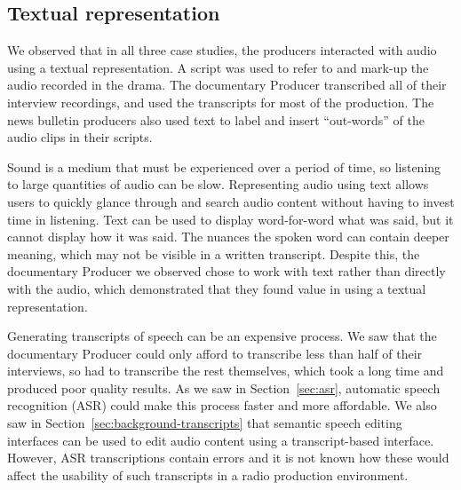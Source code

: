 
\subsection{Textual representation}
We observed that in all three case studies, the producers interacted with audio using a textual representation. A
script was used to refer to and mark-up the audio recorded in the drama. The documentary Producer transcribed all of
their interview recordings, and used the transcripts for most of the production. The news bulletin producers also used
text to label and insert ``out-words'' of the audio clips in their scripts.

Sound is a medium that must be experienced over a period of time, so listening to large quantities of audio can be
slow. Representing audio using text allows users to quickly glance through and search audio content without having to
invest time in listening. Text can be used to display word-for-word what was said, but it cannot display how it was
said. The nuances the spoken word can contain deeper meaning, which may not be visible in a written
transcript. Despite this, the documentary Producer we observed chose to work with text rather than directly with the
audio, which demonstrated that they found value in using a textual representation.

Generating transcripts of speech can be an expensive process. We saw that the documentary Producer could only afford
to transcribe less than half of their interviews, so had to transcribe the rest themselves, which took a long time and
produced poor quality results.  As we saw in Section~\ref{sec:asr}, automatic speech recognition (ASR) could make this
process faster and more affordable. We also saw in Section~\ref{sec:background-transcripts} that semantic speech
editing interfaces can be used to edit audio content using a transcript-based interface. However, ASR transcriptions
contain errors and it is not known how these would affect the usability of such transcripts in a radio production
environment.

